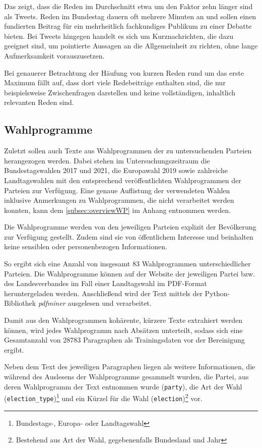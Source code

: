 Das zeigt, dass die Reden im Durchschnitt etwa um den Faktor zehn länger sind als Tweets. Reden im Bundestag dauern oft mehrere Minuten an und sollen einen fundierten Beitrag für ein mehrheitlich fachkundiges Publikum zu einer Debatte bieten. Bei Tweets hingegen handelt es sich um Kurznachrichten, die dazu geeignet sind, um pointierte Aussagen an die Allgemeinheit zu richten, ohne lange Aufmerksamkeit vorauszusetzen.

Bei genauerer Betrachtung der Häufung von kurzen Reden rund um das erste Maximum fällt auf, dass dort viele Redebeiträge enthalten sind, die nur beispielsweise Zwischenfragen darstellen und keine vollständigen, inhaltlich relevanten Reden sind.


\subsection*{Wahlprogramme}

Zuletzt sollen auch Texte aus Wahlprogrammen der zu untersuchenden Parteien herangezogen werden. Dabei stehen im Untersuchungszeitraum die Bundestagswahlen \num{2017} und \num{2021}, die Europawahl 2019 sowie zahlreiche Landtagswahlen mit den entsprechend veröffentlichten Wahlprogrammen der Parteien zur Verfügung. Eine genaue Auflistung der verwendeten Wahlen inklusive Anmerkungen zu Wahlprogrammen, die nicht verarbeitet werden konnten, kann dem \autoref{subsec:overviewWP} im Anhang entnommen werden.

Die Wahlprogramme werden von den jeweiligen Parteien explizit der Bevölkerung zur Verfügung gestellt. Zudem sind sie von öffentlichem Interesse und beinhalten keine sensiblen oder personenbezogen Informationen.

So ergibt sich eine Anzahl von insgesamt \num{83} Wahlprogrammen unterschiedlicher Parteien. Die Wahlprogramme können auf der Website der jeweiligen Partei bzw. des Landesverbandes im Fall einer Landtagswahl im \ac{PDF}-Format heruntergeladen werden. Anschließend wird der Text mittels der Python-Bibliothek \textit{pdfminer} ausgelesen und verarbeitet.

Damit aus den Wahlprogrammen kohärente, kürzere Texte extrahiert werden können, wird jedes Wahlprogramm nach Absätzen unterteilt, sodass sich eine Gesamtanzahl von \num{28783} Paragraphen als Trainingsdaten vor der Bereinigung ergibt.

Neben dem Text des jeweiligen Paragraphen liegen als weitere Informationen, die während des Auslesens der Wahlprogramme gesammelt wurden, die Partei, aus deren Wahlprogramm der Text entnommen wurde (\texttt{party}), die Art der Wahl (\texttt{election\_type})\footnote{Bundestags-, Europa- oder Landtagswahl} und ein Kürzel für die Wahl (\texttt{election})\footnote{Bestehend aus Art der Wahl, gegebenenfalls Bundesland und Jahr} vor.

